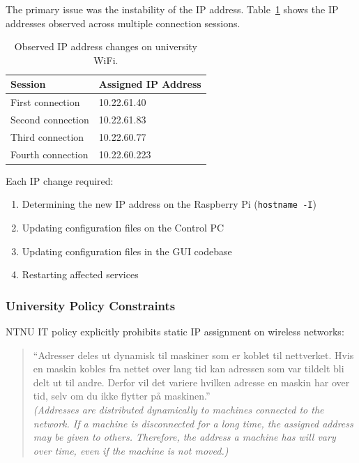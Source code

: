 The primary issue was the instability of the IP address. Table~\ref{tab:ip-changes} shows the IP addresses observed across multiple connection sessions.

\begin{table}[htbp]
    \centering
    \caption{Observed IP address changes on university WiFi.}
    \label{tab:ip-changes}
    \begin{tabular}{ll}
        \toprule
        \textbf{Session} & \textbf{Assigned IP Address} \\
        \midrule
        First connection & 10.22.61.40 \\
        Second connection & 10.22.61.83 \\
        Third connection & 10.22.60.77 \\
        Fourth connection & 10.22.60.223 \\
        \bottomrule
    \end{tabular}
\end{table}

Each IP change required:
\begin{enumerate}
    \item Determining the new IP address on the Raspberry Pi (\texttt{hostname -I})
    \item Updating configuration files on the Control PC
    \item Updating configuration files in the GUI codebase
    \item Restarting affected services
\end{enumerate}

\subsubsection{University Policy Constraints}

NTNU IT policy explicitly prohibits static IP assignment on wireless networks:

\begin{quote}
    ``Adresser deles ut dynamisk til maskiner som er koblet til nettverket. Hvis en maskin kobles fra nettet over lang tid kan adressen som var tildelt bli delt ut til andre. Derfor vil det variere hvilken adresse en maskin har over tid, selv om du ikke flytter p{\aa} maskinen.'' \\
    \textit{(Addresses are distributed dynamically to machines connected to the network. If a machine is disconnected for a long time, the assigned address may be given to others. Therefore, the address a machine has will vary over time, even if the machine is not moved.)}
\end{quote}

